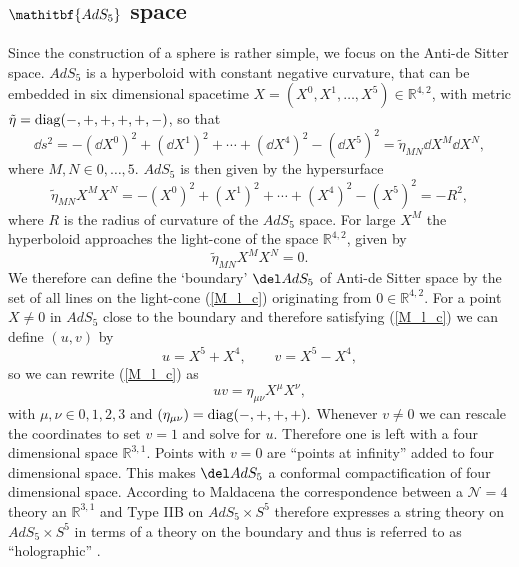 \subsection[$AdS_{5}$ space]{$\mathitbf{AdS_{5}}$ space}\label{AdS5}
Since the construction of a sphere is rather simple, we focus on the Anti-de Sitter space. $AdS_{5}$ is a hyperboloid with constant negative curvature, that can be embedded in six dimensional  spacetime $X = (X^{0},X^{1},\ldots,X^{5}) \in \mathbb{R}^{4,2}$, with metric $\tilde{\eta} = {\rm diag}(-,+,+,+,+,-)$, so that
\begin{equation}
\dd s^{2} = -\left(\dd X^{0}\right)^{2} + \left(\dd X^{1}\right)^{2} + \cdots + \left(\dd X^{4}\right)^{2} - \left(\dd X^{5}\right)^{2} = \tilde{\eta}_{MN} \dd X^{M}\dd X^{N},
\end{equation}
where $M,N \in {0,\ldots,5}$. $AdS_{5}$ is then given by the hypersurface
\begin{equation}
\tilde{\eta}_{MN}X^{M}X^{N} = -\left(X^{0}\right)^{2} + \left(X^{1}\right)^{2} + \cdots + \left(X^{4}\right)^{2} - \left(X^{5}\right)^{2} = -R^{2},
\label{hyperbol}
\end{equation}
where $R$ is the radius of curvature of the $AdS_{5}$ space. For large $X^{M}$ the hyperboloid approaches the light-cone of the  space $\mathbb{R}^{4,2}$, given by
\begin{equation}
\tilde{\eta}_{MN}X^{M}X^{N} = 0.
\label{M_l_c}
\end{equation}
We therefore can define the `boundary' $\del AdS_{5}$ of Anti-de Sitter space by the set of all lines on the light-cone (\ref{M_l_c}) originating from $0 \in \mathbb{R}^{4,2}$. For a point $X \neq 0$ in $AdS_{5}$ close to the boundary and therefore satisfying (\ref{M_l_c}) we can define $(u,v)$ by
\begin{equation}
u = X^{5}+X^{4}, \qquad v = X^{5}-X^{4},
\end{equation}
so we can rewrite (\ref{M_l_c}) as
\begin{equation}
uv = \eta_{\mu \nu} X^{\mu}X^{\nu},
\end{equation}
with $\mu,\nu \in {0,1,2,3}$ and $\left(\eta_{\mu \nu}\right) = {\rm diag}(-,+,+,+).$ Whenever $v \neq 0$ we can rescale the coordinates to set $v = 1$ and solve for $u$. Therefore one is left with a four dimensional  space $\mathbb{R}^{3,1}$. Points with $v=0$ are ``points at infinity'' added to four dimensional  space. This makes $\del AdS_{5}$ a conformal compactification of four dimensional  space. According to Maldacena \cite{maldacena1} the correspondence between a $\mathcal{N}=4$ theory an $\mathbb{R}^{3,1}$ and Type IIB on $AdS_{5}\times S^{5}$ therefore expresses a string theory on $AdS_{5}\times S^{5}$ in terms of a theory on the boundary and thus is referred to as ``holographic'' \cite{Witten:1998qj}.
%
%
